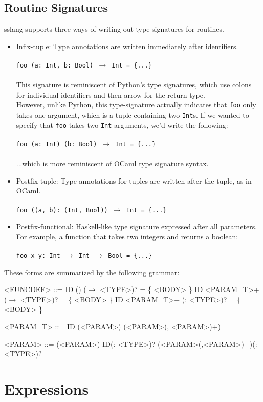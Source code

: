 \documentclass{article}
\begin{document}
\subsection{Routine Signatures}
\noindent sslang supports three ways of writing out type signatures for routines.
\begin{itemize}
    \item Infix-tuple: Type annotations are written immediately after identifiers.\\\\
    \texttt{foo (a: Int, b: Bool) $\rightarrow$ Int = \{...\}}\\\\
    This signature is reminiscent of Python's type signatures, which use colons for individual identifiers and then arrow for the return type.\\
    
    However, unlike Python, this type-signature actually indicates that \texttt{foo} only takes one argument, which is a tuple containing two \texttt{Int}s. If we wanted to specify that \texttt{foo} takes two \texttt{Int} arguments, we'd write the following:\\\\
    \texttt{foo (a: Int) (b: Bool) $\rightarrow$ Int = \{...\}}\\\\
    ...which is more reminiscent of OCaml type signature syntax.
    
    \item Postfix-tuple: Type annotations for tuples are written after the tuple, as in OCaml.\\\\
    \texttt{foo ((a, b): (Int, Bool)) $\rightarrow$ Int = \{...\}}
    \item Postfix-functional: Haskell-like type signature expressed after all parameters. For example, a function that takes two integers and returns a boolean:\\\\
    \texttt{foo x y: Int $\rightarrow$ Int $\rightarrow$ Bool = \{...\}}
\end{itemize}

\noindent These forms are summarized by the following grammar:
\setlength{\grammarindent}{5em}
\begin{grammar}
<FUNCDEF> ::= ID () ($\rightarrow$ <TYPE>)? = \{ <BODY> \}
\alt ID <PARAM_T>+ ($\rightarrow$ <TYPE>)? = \{ <BODY> \}
\alt ID <PARAM_T>+ (: <TYPE>)? = \{ <BODY> \}

<PARAM_T> ::= ID
\alt (<PARAM>)
\alt (<PARAM>(, <PARAM>)+)

<PARAM> ::= (<PARAM>)
\alt ID(: <TYPE>)?
\alt (<PARAM>(,<PARAM>)+)(: <TYPE>)?
\end{grammar}

\section{Expressions}
\end{document}
